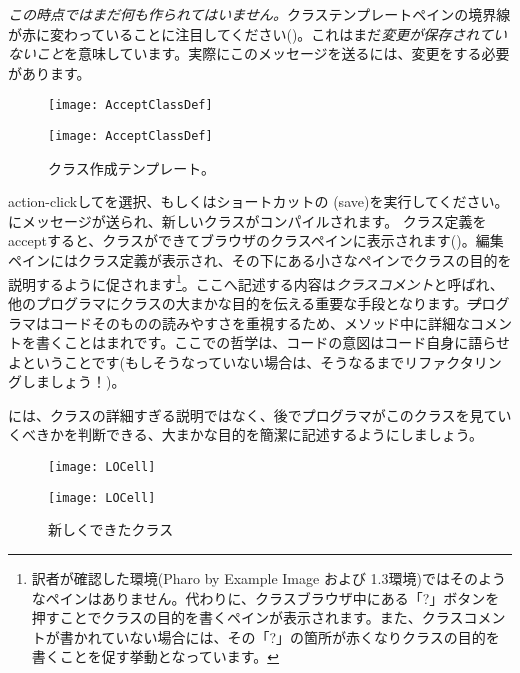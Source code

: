 \documentclass[a4paper,10pt,twoside]{book}
\begin{document}
\emph{この時点ではまだ何も作られてはいません。}クラステンプレートペインの境界線が赤に変わっていることに注目してください()。これはまだ\emph{変更が保存されていないこと}を意味しています。実際にこのメッセージを送るには、変更をする必要があります。

\begin{figure}[h!t]
\ifluluelse
	{\centerline {\texttt{[image: AcceptClassDef]}}}
	{\centerline {\texttt{[image: AcceptClassDef]}}}
\caption{クラス作成テンプレート。
}
\end{figure}

action-clickしてを選択、もしくはショートカットの (save)を実行してください。にメッセージが送られ、新しいクラスがコンパイルされます。
クラス定義をacceptすると、クラスができてブラウザのクラスペインに表示されます()。編集ペインにはクラス定義が表示され、その下にある小さなペインでクラスの目的を説明するように促されます\footnote{訳者が確認した環境(Pharo by Example Image および 1.3環境)ではそのようなペインはありません。代わりに、クラスブラウザ中にある「?」ボタンを押すことでクラスの目的を書くペインが表示されます。また、クラスコメントが書かれていない場合には、その「?」の箇所が赤くなりクラスの目的を書くことを促す挙動となっています。}。ここへ記述する内容は\emph{クラスコメント}と呼ばれ、他のプログラマにクラスの大まかな目的を伝える重要な手段となります。\st プログラマはコードそのものの読みやすさを重視するため、メソッド中に詳細なコメントを書くことはまれです。ここでの哲学は、コードの意図はコード自身に語らせよということです(もしそうなっていない場合は、そうなるまでリファクタリングしましょう！)。


には、クラスの詳細すぎる説明ではなく、後でプログラマがこのクラスを見ていくべきかを判断できる、大まかな目的を簡潔に記述するようにしましょう。


\begin{figure}[h!t]
\ifluluelse
	{\centerline {\texttt{[image: LOCell]}}}
	{\centerline {\texttt{[image: LOCell]}}}
\caption{新しくできたクラス }
\end{figure}

\end{document}
